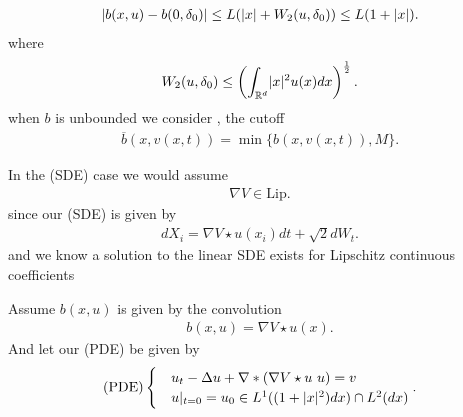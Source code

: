 \begin{align*}
  \lvert b(x,u) - b(0,\delta_0  )\rvert \le  L(\lvert x\rvert + W_2(u,\delta_0 )) \le L(1+\lvert x\rvert)
.\end{align*}
where 
\begin{align*}
  W_2(u,\delta_0) \le  \left(\int_{\mathbb{R}^{d} } \lvert x\rvert^2 u(x) dx\right)^{\frac{1}{2}} 
.\end{align*}
when $b$ is unbounded we consider , the cutoff  
\begin{align*}
  \overline{b}(x,v(x,t))  = \min \{b(x,v(x,t)), M\}  
.\end{align*}
\begin{remark}
 In the (SDE)  case we would assume 
\begin{align*}
   \nabla V \in  \text{Lip} \tag{SDE}
 .\end{align*}
 since our (SDE) is given by
 \begin{align*}
  d X_i = \nabla V \star  u(x_i) dt + \sqrt{2} dW_t
 .\end{align*}
 and we know a solution to the linear SDE exists for Lipschitz continuous coefficients 
\end{remark}
\begin{definition}\label{pde_mve_apprach}
 Assume $b(x,u) $  is given by the convolution
 \begin{align*}
  b(x,u) = \nabla V \star u(x)
 .\end{align*}
 And let our (PDE) be given by 
 \begin{align*}
  \text{(PDE)}\begin{cases}
    &u_t - \Delta u + \nabla*(\nabla V \star  u \ u) = v\\
    &u \rvert_{t=0} = u_{0} \in  L^{1}((1+\lvert x\rvert^2)dx) \cap L^{2}(dx) 
  \end{cases}
 .\end{align*}
\end{definition}
